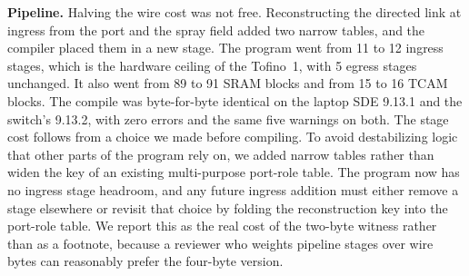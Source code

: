 \textbf{Pipeline.} Halving the wire cost was not free. Reconstructing the directed link at ingress from the port and the spray field added two narrow tables, and the compiler placed them in a new stage. The program went from 11 to 12 ingress stages, which is the hardware ceiling of the Tofino~1, with 5 egress stages unchanged. It also went from 89 to 91 SRAM blocks and from 15 to 16 TCAM blocks. The compile was byte-for-byte identical on the laptop SDE 9.13.1 and the switch's 9.13.2, with zero errors and the same five warnings on both. The stage cost follows from a choice we made before compiling. To avoid destabilizing logic that other parts of the program rely on, we added narrow tables rather than widen the key of an existing multi-purpose port-role table. The program now has no ingress stage headroom, and any future ingress addition must either remove a stage elsewhere or revisit that choice by folding the reconstruction key into the port-role table. We report this as the real cost of the two-byte witness rather than as a footnote, because a reviewer who weights pipeline stages over wire bytes can reasonably prefer the four-byte version.
